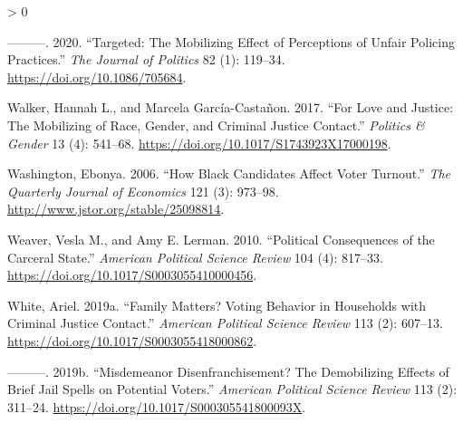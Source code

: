 \documentclass[
  12pt,
]{article}
\newlength{\cslhangindent}
\newenvironment{CSLReferences}[2] %
 {%
  \setlength{\parindent}{0pt}
  \ifodd #1 \everypar{\setlength{\hangindent}{\cslhangindent}}\ignorespaces\fi
  \ifnum #2 > 0
  \setlength{\parskip}{#2\baselineskip}
  \fi
 }%
 {}
\begin{document}
\begin{CSLReferences}{1}{0}
\leavevmode\hypertarget{ref-Walker2020}{}%
---------. 2020. {``Targeted: {The Mobilizing Effect} of {Perceptions} of {Unfair Policing Practices}.''} \emph{The Journal of Politics} 82 (1): 119--34. \url{https://doi.org/10.1086/705684}.

\leavevmode\hypertarget{ref-Walker2017}{}%
Walker, Hannah L., and Marcela García-Castañon. 2017. {``For {Love} and {Justice}: {The Mobilizing} of {Race}, {Gender}, and {Criminal Justice Contact}.''} \emph{Politics \& Gender} 13 (4): 541--68. \url{https://doi.org/10.1017/S1743923X17000198}.

\leavevmode\hypertarget{ref-Washington2006}{}%
Washington, Ebonya. 2006. {``How {Black Candidates Affect Voter Turnout}.''} \emph{The Quarterly Journal of Economics} 121 (3): 973--98. \url{http://www.jstor.org/stable/25098814}.

\leavevmode\hypertarget{ref-Weaver2010}{}%
Weaver, Vesla M., and Amy E. Lerman. 2010. {``Political {Consequences} of the {Carceral State}.''} \emph{American Political Science Review} 104 (4): 817--33. \url{https://doi.org/10.1017/S0003055410000456}.

\leavevmode\hypertarget{ref-White2019a}{}%
White, Ariel. 2019a. {``Family {Matters}? {Voting Behavior} in {Households} with {Criminal Justice Contact}.''} \emph{American Political Science Review} 113 (2): 607--13. \url{https://doi.org/10.1017/S0003055418000862}.

\leavevmode\hypertarget{ref-White2019}{}%
---------. 2019b. {``Misdemeanor {Disenfranchisement}? {The Demobilizing Effects} of {Brief Jail Spells} on {Potential Voters}.''} \emph{American Political Science Review} 113 (2): 311--24. \url{https://doi.org/10.1017/S000305541800093X}.

\end{CSLReferences}
\end{document}

